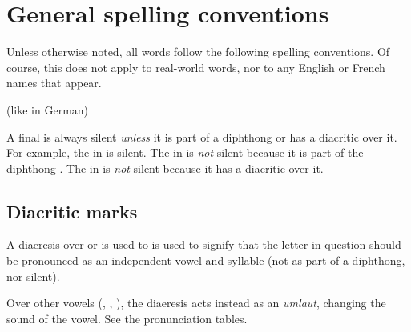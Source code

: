 \section{General spelling conventions}
Unless otherwise noted, all \Miithian{} words follow the following spelling conventions. 
Of course, this does not apply to real-world words, nor to any English or French names that appear. 

\begin{pronunciationenvironment}{}
   (like in German)
\end{pronunciationenvironment}

A final  is always silent \emph{unless} it is part of a diphthong or has a diacritic over it. 
For example, the  in \pex{\scathaese} is silent.
The  in \pex{\scathae} is \emph{not} silent because it is part of the diphthong .
The  in \pex{\Samure} is \emph{not} silent because it has a diacritic over it.









\subsection{Diacritic marks}
A diaeresis over  or  is used to is used to signify that the letter in question should be pronounced as an independent vowel and syllable (not as part of a diphthong, nor silent). 

Over other vowels (, , ), the diaeresis acts instead as an \emph{umlaut}, changing the sound of the vowel. 
See the pronunciation tables. 
















